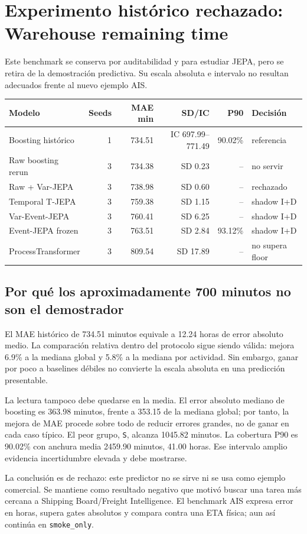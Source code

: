 \documentclass[11pt,a4paper]{article}
\begin{document}
\section{Experimento histórico rechazado: Warehouse remaining time}
Este benchmark se conserva por auditabilidad y para estudiar JEPA, pero se retira de la demostración predictiva. Su escala absoluta e intervalo no resultan adecuados frente al nuevo ejemplo AIS.
\begin{tabularx}{\linewidth}{Xrrrrl}\toprule
Modelo & Seeds & MAE min & SD/IC & P90 & Decisión \\
\midrule
Boosting histórico & 1 & 734.51 & IC 697.99--771.49 & 90.02\% & referencia \\
Raw boosting rerun & 3 & 734.38 & SD 0.23 & -- & no servir \\
Raw + Var-JEPA & 3 & 738.98 & SD 0.60 & -- & rechazado \\
Temporal T-JEPA & 3 & 759.38 & SD 1.15 & -- & shadow I+D \\
Var-Event-JEPA & 3 & 760.41 & SD 6.25 & -- & shadow I+D \\
Event-JEPA frozen & 3 & 763.51 & SD 2.84 & 93.12\% & shadow I+D \\
ProcessTransformer & 3 & 809.54 & SD 17.89 & -- & no supera floor \\
\bottomrule\end{tabularx}

\subsection{Por qué los aproximadamente 700 minutos no son el demostrador}
El MAE histórico de 734.51 minutos equivale a 12.24 horas de error absoluto medio. La comparación relativa dentro del protocolo sigue siendo válida: mejora 6.9\% a la mediana global y 5.8\% a la mediana por actividad. Sin embargo, ganar por poco a baselines débiles no convierte la escala absoluta en una predicción presentable.

La lectura tampoco debe quedarse en la media. El error absoluto mediano de boosting es 363.98 minutos, frente a 353.15 de la mediana global; por tanto, la mejora de MAE procede sobre todo de reducir errores grandes, no de ganar en cada caso típico. El peor grupo, \texttt{S}, alcanza 1045.82 minutos. La cobertura P90 es 90.02\% con anchura media 2459.90 minutos, 41.00 horas. Ese intervalo amplio evidencia incertidumbre elevada y debe mostrarse.

La conclusión es de rechazo: este predictor no se sirve ni se usa como ejemplo comercial. Se mantiene como resultado negativo que motivó buscar una tarea más cercana a Shipping Board/Freight Intelligence. El benchmark AIS expresa error en horas, supera gates absolutos y compara contra una ETA física; aun así continúa en \texttt{smoke\_only}.
\end{document}
